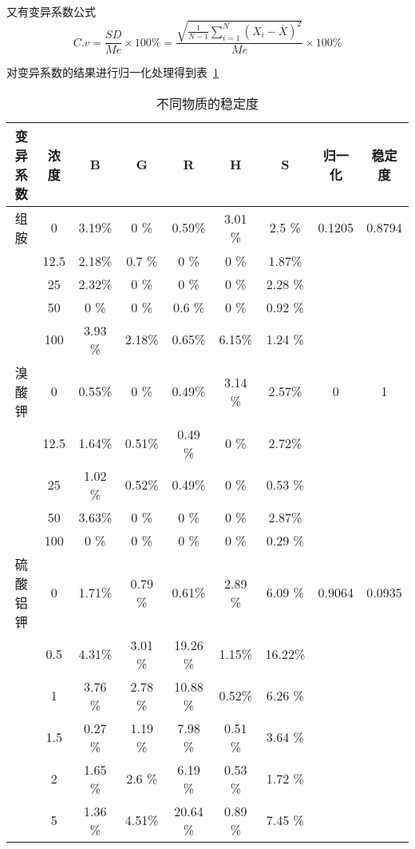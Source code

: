     又有变异系数公式
    $$C.v = \frac{SD}{Me} \times 100\% = 
    \frac{\sqrt{\frac{1}{N - 1} \sum_{i=1}^{N} (X_{i} - \overline{X})^2 }} {Me} \times 100\%$$

    对变异系数的结果进行归一化处理得到表~\ref{不同物质的稳定度}
    
    \begin{table}[H]
    \centering
    \caption{不同物质的稳定度}
    \label{不同物质的稳定度}
    \begin{tabular}{@{}ccccccccc@{}}
    \toprule
    变异系数 & 浓度   & B    & G    & R     & H     & S     & 归一化  & 稳定度  \\ \midrule
    组胺   & 0    & 3.19\% & 0   \% & 0.59\%  & 3.01 \% & 2.5  \% & 0.1205
     & 0.8794 \\
         & 12.5 & 2.18\% & 0.7 \% & 0   \%  & 0    \% & 1.87\%  &      &      \\
         & 25   & 2.32\% & 0 \%   & 0 \%    & 0 \%    & 2.28 \% &      &      \\
         & 50   & 0  \%  & 0   \% & 0.6 \%  & 0  \%   & 0.92 \% &      &      \\
         & 100  & 3.93 \%& 2.18\% & 0.65\%  & 6.15\%  & 1.24 \% &      &      \\
    溴酸钾  & 0    & 0.55\% & 0   \% & 0.49\%  & 3.14 \% & 2.57\%  & 0    & 1    \\
         & 12.5 & 1.64\% & 0.51\% & 0.49 \% & 0 \%    & 2.72\%  &      &      \\
         & 25   & 1.02 \%& 0.52\% & 0.49\%  & 0  \%   & 0.53 \% &      &      \\
         & 50   & 3.63\% & 0   \% & 0 \%    & 0    \% & 2.87\%  &      &      \\
         & 100  & 0  \%  & 0   \% & 0   \%  & 0 \%    & 0.29 \% &      &      \\
    硫酸铝钾 & 0    & 1.71\% & 0.79 \%& 0.61\%  & 2.89 \% & 6.09 \% & 0.9064 & 0.0935 \\
         & 0.5  & 4.31\% & 3.01 \%& 19.26 \%& 1.15\%  & 16.22\% &      &      \\
         & 1    & 3.76 \%& 2.78 \%& 10.88 \%& 0.52\%  & 6.26 \% &      &      \\
         & 1.5  & 0.27 \%& 1.19 \%& 7.98  \%& 0.51 \% & 3.64 \% &      &      \\
         & 2    & 1.65 \%& 2.6  \%& 6.19  \%& 0.53 \% & 1.72 \% &      &      \\
         & 5    & 1.36 \%& 4.51\% & 20.64 \%& 0.89 \% & 7.45 \% &      &      \\

\end{tabular}
\end{table}
